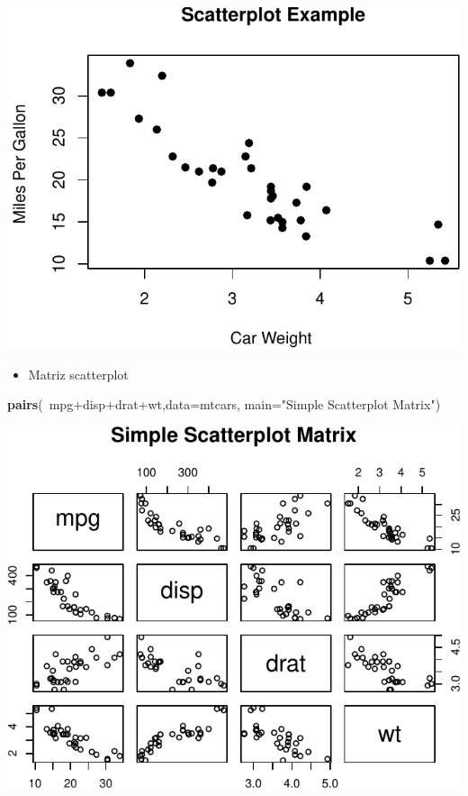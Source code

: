 \documentclass[]{article}
\def\tightlist{}
\newenvironment{Shaded}{\begin{snugshade}}{\end{snugshade}}
\newcommand{\KeywordTok}[1]{\textcolor[rgb]{0.13,0.29,0.53}{\textbf{{#1}}}}
\newcommand{\DataTypeTok}[1]{\textcolor[rgb]{0.13,0.29,0.53}{{#1}}}
\newcommand{\StringTok}[1]{\textcolor[rgb]{0.31,0.60,0.02}{{#1}}}
\newcommand{\NormalTok}[1]{{#1}}
\numberwithin{equation}{section}
\begin{document}
\includegraphics{tema1_files/figure-latex/unnamed-chunk-63-1.pdf}

\begin{itemize}
\tightlist
\item
  Matriz scatterplot
\end{itemize}

\begin{Shaded}
\begin{Highlighting}[]
\KeywordTok{pairs}\NormalTok{(~mpg+disp+drat+wt,}\DataTypeTok{data=}\NormalTok{mtcars,}
   \DataTypeTok{main=}\StringTok{"Simple Scatterplot Matrix"}\NormalTok{)}
\end{Highlighting}
\end{Shaded}

\includegraphics{tema1_files/figure-latex/unnamed-chunk-64-1.pdf}
\end{document}
